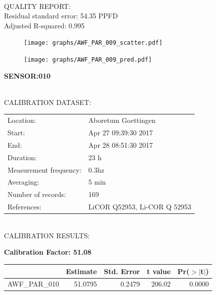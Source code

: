 \documentclass[oneside]{report}
\begin{document}
\hrulefill\\
QUALITY REPORT:\\
Residual standard error: 54.35 PPFD\\
Adjusted R-squared: 0.995



\begin{figure}[H]
  \centering
  \texttt{[image: graphs/AWF\_PAR\_009\_scatter.pdf]}
\end{figure}




\begin{figure}[H]
  \centering
  \texttt{[image: graphs/AWF\_PAR\_009\_pred.pdf]}
\end{figure}

\pagebreak


\begin{center}
\large{\textbf{SENSOR:010}}\\
\end{center}

\hrulefill\\
CALIBRATION DATASET:\\
\begin{table}[h!]
  \centering
  \label{tab:table1}
  \begin{tabular}{ll}
    Location: & Aboretum Goettingen\\ 
    
    
    Start:  & Apr 27 09:39:30 2017 \\
    End:   & Apr 28 08:51:30 2017\\ 
    Duration: & 23 h\\
    Measurement frequency: & 0.3hz\\
    Averaging:  &5 min\\
    Number of records: & 169 \\
    References: & LiCOR Q52953, Li-COR Q 52953 \\
  \end{tabular}
\end{table}

\hrulefill\\
CALIBRATION RESULTS:\\


\begin{center}
\textbf{\large{Calibration Factor: 51.08}}\\
\end{center}
\begin{table}[ht]
\centering
\begin{tabular}{rrrrr}
  \hline
 & Estimate & Std. Error & t value & Pr($>$$|$t$|$) \\ 
  \hline
AWF\_PAR\_010 & 51.0795 & 0.2479 & 206.02 & 0.0000 \\ 
   \hline
\end{tabular}
\end{table}
\end{document}
